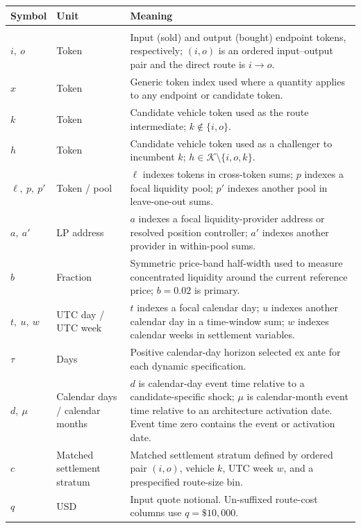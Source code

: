 \begingroup
\renewcommand{\arraystretch}{1.45}
\begin{tabularx}{\linewidth}{@{}>{\raggedright\arraybackslash}Xl>{\raggedright\arraybackslash}X@{}}
\toprule
Symbol & Unit & Meaning \\
\midrule
\multicolumn{3}{@{}l}{\textit{Indices}} \\
$i,\ o$ & Token & Input (sold) and output (bought) endpoint tokens, respectively; $(i,o)$ is an ordered input--output pair and the direct route is $i\to o$. \\
$x$ & Token & Generic token index used where a quantity applies to any endpoint or candidate token. \\
$k$ & Token & Candidate vehicle token used as the route intermediate; $k\notin\{i,o\}$. \\
$h$ & Token & Candidate vehicle token used as a challenger to incumbent $k$; $h\in\mathcal K\setminus\{i,o,k\}$. \\
$\ell,\ p,\ p'$ & Token / pool & $\ell$ indexes tokens in cross-token sums; $p$ indexes a focal liquidity pool; $p'$ indexes another pool in leave-one-out sums. \\
$a,\ a'$ & LP address & $a$ indexes a focal liquidity-provider address or resolved position controller; $a'$ indexes another provider in within-pool sums. \\
$b$ & Fraction & Symmetric price-band half-width used to measure concentrated liquidity around the current reference price; $b=0.02$ is primary. \\
$t,\ u,\ w$ & UTC day / UTC week & $t$ indexes a focal calendar day; $u$ indexes another calendar day in a time-window sum; $w$ indexes calendar weeks in settlement variables. \\
$\tau$ & Days & Positive calendar-day horizon selected ex ante for each dynamic specification. \\
$d,\ \mu$ & Calendar days / calendar months & $d$ is calendar-day event time relative to a candidate-specific shock; $\mu$ is calendar-month event time relative to an architecture activation date. Event time zero contains the event or activation date. \\
$c$ & Matched settlement stratum & Matched settlement stratum defined by ordered pair $(i,o)$, vehicle $k$, UTC week $w$, and a prespecified route-size bin. \\
$q$ & USD & Input quote notional. Un-suffixed route-cost columns use $q=\$10{,}000$. \\

\end{tabularx}

